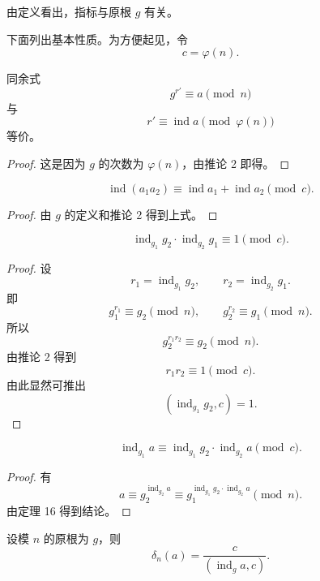 由定义看出，指标与原根 $g$ 有关。

下面列出基本性质。为方便起见，令
\[
	c=\varphi(n).
\]

\begin{theorem}[原文 定理 16]
	同余式
	\[
		g^{r'}\equiv a\pmod n
	\]
	与
	\[
		r'\equiv \operatorname{ind}a\pmod{\varphi(n)}
	\]
	等价。
\end{theorem}

\begin{proof}
	这是因为 $g$ 的次数为 $\varphi(n)$，由推论 2 即得。
\end{proof}

\begin{theorem}[原文 定理 17]
	\[
		\operatorname{ind}(a_1a_2)
		\equiv
		\operatorname{ind}a_1+\operatorname{ind}a_2
		\pmod c.
	\]
\end{theorem}

\begin{proof}
	由 $g$ 的定义和推论 2 得到上式。
\end{proof}

\begin{theorem}[原文 定理 18]
	\[
		\operatorname{ind}_{g_1}g_2\cdot \operatorname{ind}_{g_2}g_1
		\equiv 1\pmod c.
	\]
\end{theorem}

\begin{proof}
	设
	\[
		r_1=\operatorname{ind}_{g_1}g_2,
		\qquad
		r_2=\operatorname{ind}_{g_2}g_1.
	\]
	即
	\[
		g_1^{r_1}\equiv g_2\pmod n,
		\qquad
		g_2^{r_2}\equiv g_1\pmod n.
	\]
	所以
	\[
		g_2^{r_1r_2}\equiv g_2\pmod n.
	\]
	由推论 2 得到
	\[
		r_1r_2\equiv 1\pmod c.
	\]
	由此显然可推出
	\[
		(\operatorname{ind}_{g_1}g_2,c)=1.
	\]
\end{proof}

\begin{theorem}[原文 定理 19]
	\[
		\operatorname{ind}_{g_1}a
		\equiv
		\operatorname{ind}_{g_1}g_2\cdot\operatorname{ind}_{g_2}a
		\pmod c.
	\]
\end{theorem}

\begin{proof}
	有
	\[
		a\equiv g_2^{\operatorname{ind}_{g_2}a}
		\equiv
		g_1^{\operatorname{ind}_{g_1}g_2\cdot\operatorname{ind}_{g_2}a}
		\pmod n.
	\]
	由定理 16 得到结论。
\end{proof}

\begin{theorem}[原文 定理 20]
	设模 $n$ 的原根为 $g$，则
	\[
		\delta_n(a)=\frac{c}{(\operatorname{ind}_g a,c)}.
	\]
\end{theorem}

